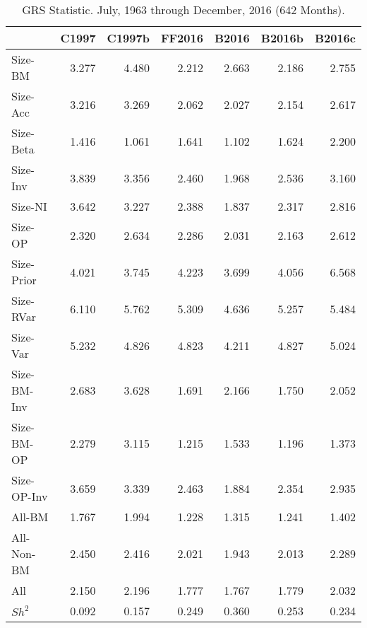 
\begin{table}[!ht]
\centering
\caption{GRS Statistic. \footnotesize{July, 1963 through December, 2016 (642 Months).}}
\begin{tabular}{lrrrrrr}
  \toprule
     & C1997  & C1997b  & FF2016  & B2016  & B2016b  & B2016c  \\
  \midrule

  
    Size-BM  & 3.277  & 4.480  & 2.212  & 2.663  & 2.186  & 2.755  \\
  
    Size-Acc  & 3.216  & 3.269  & 2.062  & 2.027  & 2.154  & 2.617  \\
  
    Size-Beta  & 1.416  & 1.061  & 1.641  & 1.102  & 1.624  & 2.200  \\
  
    Size-Inv  & 3.839  & 3.356  & 2.460  & 1.968  & 2.536  & 3.160  \\
  
    Size-NI  & 3.642  & 3.227  & 2.388  & 1.837  & 2.317  & 2.816  \\
  
    Size-OP  & 2.320  & 2.634  & 2.286  & 2.031  & 2.163  & 2.612  \\
  
    Size-Prior  & 4.021  & 3.745  & 4.223  & 3.699  & 4.056  & 6.568  \\
  
    Size-RVar  & 6.110  & 5.762  & 5.309  & 4.636  & 5.257  & 5.484  \\
  
    Size-Var  & 5.232  & 4.826  & 4.823  & 4.211  & 4.827  & 5.024  \\
  
    Size-BM-Inv  & 2.683  & 3.628  & 1.691  & 2.166  & 1.750  & 2.052  \\
  
    Size-BM-OP  & 2.279  & 3.115  & 1.215  & 1.533  & 1.196  & 1.373  \\
  
    Size-OP-Inv  & 3.659  & 3.339  & 2.463  & 1.884  & 2.354  & 2.935  \\
  
    All-BM  & 1.767  & 1.994  & 1.228  & 1.315  & 1.241  & 1.402  \\
  
    All-Non-BM  & 2.450  & 2.416  & 2.021  & 1.943  & 2.013  & 2.289  \\
  
    All  & 2.150  & 2.196  & 1.777  & 1.767  & 1.779  & 2.032  \\
  
    $Sh^2$  & 0.092  & 0.157  & 0.249  & 0.360  & 0.253  & 0.234  \\
  

  \bottomrule
\end{tabular}
\label{tbl:GRS}
\end{table}
